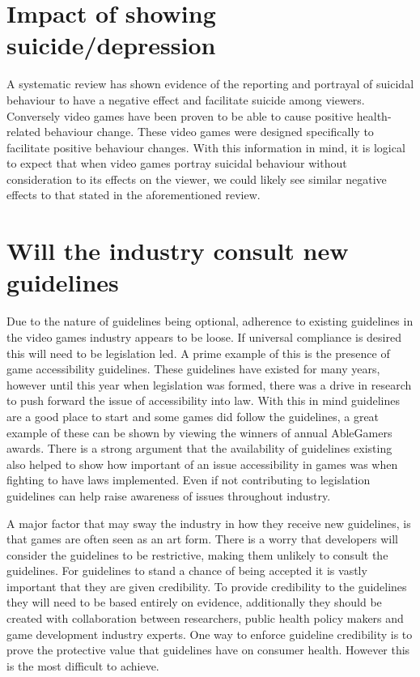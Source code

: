 \documentclass{scrartcl}
\begin{document}
	\section{Impact of showing suicide/depression}
		A systematic review\cite{pirkis2001suicide} has shown evidence of the reporting and portrayal of suicidal behaviour to have a negative effect and facilitate suicide among viewers. Conversely video games have been proven to be able to cause positive health-related behaviour change\cite{baranowski2008playing}. These video games were designed specifically to facilitate positive behaviour changes. With this information in mind, it is logical to expect that when video games portray suicidal behaviour without consideration to its effects on the viewer, we could likely see similar negative effects to that stated in the aforementioned review\cite{pirkis2001suicide}.
		

	\section{Will the industry consult new guidelines}
		Due to the nature of guidelines being optional, adherence to existing guidelines in the video games industry appears to be loose. If universal compliance is desired this will need to be legislation led. A prime example of this is the presence of game accessibility guidelines. These guidelines have existed for many years\cite{accessGuidelines1,accessGuidelines2}, however until this year when legislation was formed, there was a drive in research to push forward the issue of accessibility into law\cite{powers2015video}. With this in mind guidelines are a good place to start and some games did follow the guidelines, a great example of these can be shown by viewing the winners of annual AbleGamers awards\cite{ableGamers}. There is a strong argument that the availability of guidelines existing also helped to show how important of an issue accessibility in games was when fighting to have laws implemented. Even if not contributing to legislation guidelines can help raise awareness of issues throughout industry.
		
		A major factor that may sway the industry in how they receive new guidelines, is that games are often seen as an art form\cite{pearce2006games}. There is a worry that developers will consider the guidelines to be restrictive, making them unlikely to consult the guidelines. For guidelines to stand a chance of being accepted it is vastly important that they are given credibility. To provide credibility to the guidelines they will need to be based entirely on evidence, additionally they should be created with collaboration between researchers, public health policy makers and game development industry experts\cite{hawton2002influences}. One way to enforce guideline credibility is to prove the protective value that guidelines have on consumer health. However this is the most difficult to achieve.
		
\end{document}

